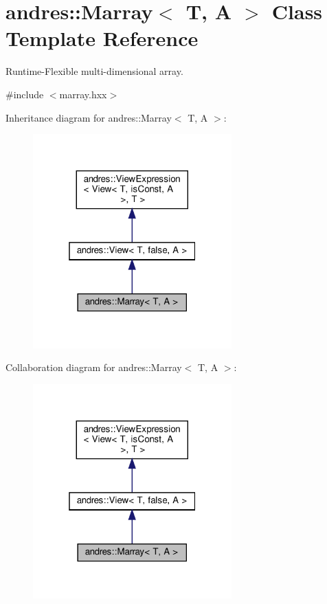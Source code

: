 \hypertarget{classandres_1_1Marray}{}\section{andres\+:\+:Marray$<$ T, A $>$ Class Template Reference}
\label{classandres_1_1Marray}


Runtime-\/\+Flexible multi-\/dimensional array.  




{\ttfamily \#include $<$marray.\+hxx$>$}



Inheritance diagram for andres\+:\+:Marray$<$ T, A $>$\+:
\nopagebreak
\begin{figure}[H]
\begin{center}
\leavevmode
\includegraphics[width=217pt]{classandres_1_1Marray__inherit__graph}
\end{center}
\end{figure}


Collaboration diagram for andres\+:\+:Marray$<$ T, A $>$\+:
\nopagebreak
\begin{figure}[H]
\begin{center}
\leavevmode
\includegraphics[width=217pt]{classandres_1_1Marray__coll__graph}
\end{center}
\end{figure}
